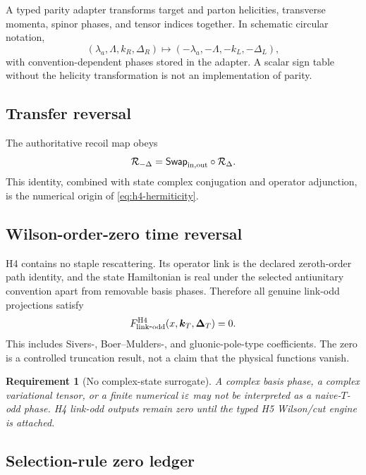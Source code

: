 \documentclass[11pt]{article}
\newtheorem{requirement}[definition]{Requirement}
\newcommand{\kT}{\bm{k}_{T}}
\newcommand{\DT}{\bm{\Delta}_{T}}
\newcommand{\cR}{\mathcal R}
\newcommand{\eps}{\varepsilon}
\begin{document}
A typed parity adapter transforms target and parton helicities, transverse
momenta, spinor phases, and tensor indices together.  In schematic circular
notation,
\begin{equation}
 (\lambda_a,\Lambda,k_R,\Delta_R)
 \longmapsto
 (-\lambda_a,-\Lambda,-k_L,-\Delta_L),
 \label{eq:lf-parity}
\end{equation}
with convention-dependent phases stored in the adapter.  A scalar sign table
without the helicity transformation is not an implementation of parity.

\subsection{Transfer reversal}

The authoritative recoil map obeys
\begin{equation}
 \cR_{-\Delta}
 =\mathsf{Swap}_{\rm in,out}\circ\cR_{\Delta}.
 \label{eq:recoil-transfer-reversal}
\end{equation}
This identity, combined with state complex conjugation and operator adjunction,
is the numerical origin of \cref{eq:h4-hermiticity}.

\subsection{Wilson-order-zero time reversal}

H4 contains no staple rescattering.  Its operator link is the declared
zeroth-order path identity, and the state Hamiltonian is real under the
selected antiunitary convention apart from removable basis phases.  Therefore
all genuine link-odd projections satisfy
\begin{equation}
 F_{\rm link\mbox{-}odd}^{\mathrm{H4}}(x,\kT,\DT)=0.
 \label{eq:h4-link-odd-zero}
\end{equation}
This includes Sivers-, Boer--Mulders-, and gluonic-pole-type coefficients.
The zero is a controlled truncation result, not a claim that the physical
functions vanish.

\begin{requirement}[No complex-state surrogate]
\label{req:no-complex-state-surrogate}
A complex basis phase, a complex variational tensor, or a finite numerical
\(i\eps\) may not be interpreted as a naive-\(T\)-odd phase.  H4 link-odd
outputs remain zero until the typed H5 Wilson/cut engine is attached.
\end{requirement}

\subsection{Selection-rule zero ledger}
\end{document}
